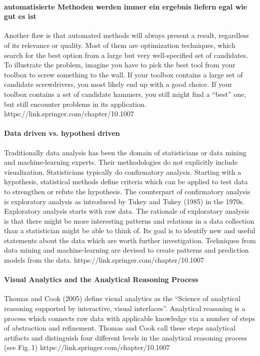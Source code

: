 \paragraph{automatisierte Methoden werden immer ein ergebnis liefern egal wie gut es ist}
Another flaw is that automated methods will always present a result, regardless of its relevance or quality. Most of them are optimization techniques, which search for the best option from a large but very well-specified set of candidates. To illustrate the problem, imagine you have to pick the best tool from your toolbox to screw something to the wall. If your toolbox contains a large set of candidate screwdrivers, you most likely end up with a good choice. If your toolbox contains a set of candidate hammers, you still might find a “best” one, but still encounter problems in its application.
https://link.springer.com/chapter/10.1007%

\paragraph{Data driven vs. hypothesi driven}
Traditionally data analysis has been the domain of statisticians or data mining and machine-learning experts. Their methodologies do not explicitly include visualization. Statisticians typically do confirmatory analysis. Starting with a hypothesis, statistical methods define criteria which can be applied to test data to strengthen or refute the hypothesis. The counterpart of confirmatory analysis is exploratory analysis as introduced by Tukey and Tukey (1985) in the 1970s. Exploratory analysis starts with raw data. The rationale of exploratory analysis is that there might be more interesting patterns and relations in a data collection than a statistician might be able to think of. Its goal is to identify new and useful statements about the data which are worth further investigation. Techniques from data mining and machine-learning are devised to create patterns and prediction models from the data.
https://link.springer.com/chapter/10.1007%

\paragraph{Visual Analytics and the Analytical Reasoning Process}
Thomas and Cook (2005) define visual analytics as the “Science of analytical reasoning supported by interactive, visual interfaces”. Analytical reasoning is a process which connects raw data with applicable knowledge via a number of steps of abstraction and refinement. Thomas and Cook call these steps analytical artifacts and distinguish four different levels in the analytical reasoning process (see Fig. 1)
https://link.springer.com/chapter/10.1007%

